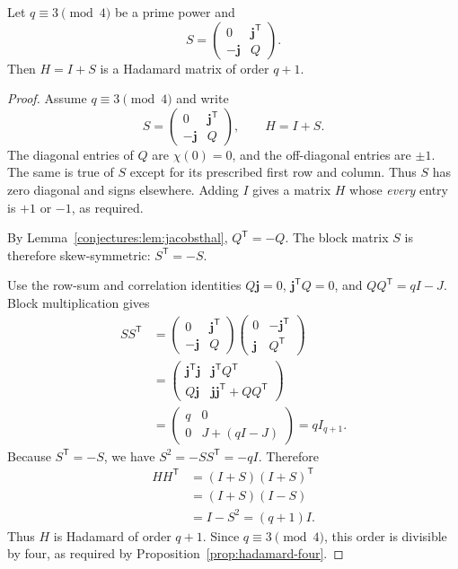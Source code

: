 \begin{theorem}[Paley I, 1933]\label{conjectures:thm:paley1}
Let $q\equiv3\pmod4$ be a prime power and
\[
S=\begin{pmatrix}0&\mathbf j^{\mathsf T}\\-\mathbf j&Q\end{pmatrix}.
\]
Then $H=I+S$ is a Hadamard matrix of order $q+1$.
\end{theorem}
\begin{proof}
Assume $q\equiv3\pmod4$
and write
\[
S=\begin{pmatrix}
0&\mathbf j^{\mathsf T}\\
-\mathbf j&Q
\end{pmatrix},
\qquad H=I+S.
\]
The diagonal entries of $Q$
are $\chi(0)=0$, and the
off-diagonal entries are
$\pm1$. The same is true
of $S$ except for its
prescribed first row and column.
Thus $S$ has zero diagonal
and signs elsewhere. Adding $I$
gives a matrix $H$ whose
\emph{every} entry is $+1$
or $-1$, as required.

By Lemma~\ref{conjectures:lem:jacobsthal},
$Q^{\mathsf T}=-Q$. The block
matrix $S$ is therefore
skew-symmetric:
$S^{\mathsf T}=-S$.

Use the row-sum and correlation
identities $Q\mathbf j=0$,
$\mathbf j^{\mathsf T}Q=0$,
and $QQ^{\mathsf T}=qI-J$.
Block multiplication gives
\[
\begin{aligned}
SS^{\mathsf T}
&=
\begin{pmatrix}
0&\mathbf j^{\mathsf T}\\
-\mathbf j&Q
\end{pmatrix}
\begin{pmatrix}
0&-\mathbf j^{\mathsf T}\\
\mathbf j&Q^{\mathsf T}
\end{pmatrix}\\
&=
\begin{pmatrix}
\mathbf j^{\mathsf T}\mathbf j&
\mathbf j^{\mathsf T}Q^{\mathsf T}\\
Q\mathbf j&
\mathbf j\mathbf j^{\mathsf T}+QQ^{\mathsf T}
\end{pmatrix}\\
&=\begin{pmatrix}q&0\\0&J+(qI-J)\end{pmatrix}
=qI_{q+1}.
\end{aligned}
\]
Because $S^{\mathsf T}=-S$,
we have $S^2=-SS^{\mathsf T}=-qI$.
Therefore
\[
\begin{aligned}
HH^{\mathsf T}
&=(I+S)(I+S)^{\mathsf T}\\
&=(I+S)(I-S)\\
&=I-S^2=(q+1)I.
\end{aligned}
\]
Thus $H$ is Hadamard of order
$q+1$. Since $q\equiv3\pmod4$,
this order is divisible by four,
as required by
Proposition~\ref{prop:hadamard-four}.
\end{proof}

